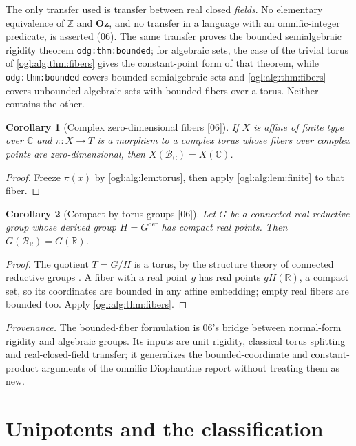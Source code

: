 \documentclass[11pt,oneside]{article}
\numberwithin{equation}{section}
\newtheorem{corollary}[corollary]{Corollary}
\theoremstyle{definition}
\theoremstyle{remark}
\newcommand{\Oz}{\mathbf{Oz}}
\newcommand{\Z}{\mathbb Z}
\newcommand{\R}{\mathbb R}
\newcommand{\C}{\mathbb C}
\newcommand{\BR}{\mathcal B_{\R}}
\newcommand{\BC}{\mathcal B_{\C}}
\newcommand{\der}{\mathrm{der}}
\newcommand{\src}[1]{\textup{\textsf{\small[#1]}}}
\newcommand{\replabel}[1]{\nolinkurl{#1}}
\newcommand{\status}[1]{\par\smallskip\noindent\textit{Provenance.} #1\par\smallskip}
\begin{document}
The only transfer used is transfer between real closed \emph{fields}. No
elementary equivalence of $\Z$ and $\Oz$, and no transfer in a language with an
omnific-integer predicate, is asserted (06). The same transfer proves the
bounded semialgebraic rigidity theorem \replabel{odg:thm:bounded}; for
algebraic sets, the case of the trivial torus of \cref{ogl:alg:thm:fibers}
gives the constant-point form of that theorem, while \replabel{odg:thm:bounded}
covers bounded semialgebraic sets and \cref{ogl:alg:thm:fibers} covers
unbounded algebraic sets with bounded fibers over a torus. Neither contains the
other.

\begin{corollary}[Complex zero-dimensional fibers \src{06}]\label{ogl:alg:cor:quasifinite}
If $X$ is affine of finite type over $\C$ and $\pi:X\to T$ is a morphism to a
complex torus whose fibers over complex points are zero-dimensional, then
$X(\BC)=X(\C)$.
\end{corollary}
\begin{proof}
Freeze $\pi(x)$ by \cref{ogl:alg:lem:torus}, then apply
\cref{ogl:alg:lem:finite} to that fiber.
\end{proof}

\begin{corollary}[Compact-by-torus groups \src{06}]\label{ogl:alg:cor:compacttorus}
Let $G$ be a connected real reductive group whose derived group $H=G^{\der}$
has compact real points. Then $G(\BR)=G(\R)$.
\end{corollary}
\begin{proof}
The quotient $T=G/H$ is a torus, by the structure theory of connected
reductive groups \cite{MilneAG}. A fiber with a real point $g$ has real points
$gH(\R)$, a compact set, so its coordinates are bounded in any affine
embedding; empty real fibers are bounded too. Apply \cref{ogl:alg:thm:fibers}.
\end{proof}

\status{The bounded-fiber formulation is 06's bridge between normal-form
rigidity and algebraic groups. Its inputs are unit rigidity, classical torus
splitting and real-closed-field transfer; it generalizes the bounded-coordinate
and constant-product arguments of the omnific Diophantine report without
treating them as new.}

\section{Unipotents and the classification}\label{ogl:alg:sec:dichotomy}
\end{document}
